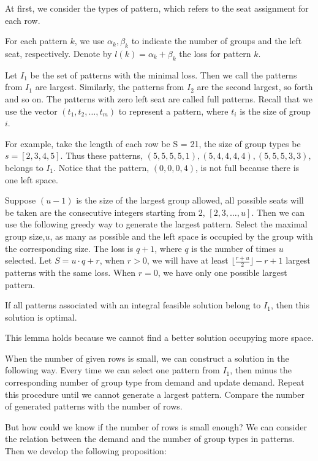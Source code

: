 At first, we consider the types of pattern, which refers to the seat assignment for each row.

For each pattern $k$, we use $\alpha_k, \beta_k$ to indicate the number of groups and the left seat, respectively. Denote by $l(k) = \alpha_k + \beta_k$ the loss for pattern $k$.

Let $I_1$ be the set of patterns with the minimal loss. Then we call the patterns from $I_1$ are largest. Similarly, the patterns from $I_2$ are the second largest, so forth and so on. The patterns with zero left seat are called full patterns. Recall that we use the vector $(t_1, t_2, \ldots, t_m)$ to represent a pattern, where $t_i$ is the size of group $i$. 

For example, take the length of each row be S = 21, the size of group types be $s = [2, 3, 4, 5]$. Thus these patterns, $(5, 5, 5, 5, 1),(5, 4, 4, 4, 4),(5, 5, 5, 3, 3)$, belongs to $I_1$. Notice that
the pattern, $(0, 0, 0, 4)$, is not full because there is one left space.

Suppose $(u-1)$ is the size of the largest group allowed, all possible seats will be taken are the consecutive integers starting from 2, $[2,3,\ldots,u]$.
Then we can use the following greedy way to generate the largest pattern. Select the maximal group size,$u$, as many as possible and the left space is occupied by the group with the corresponding size. The loss is $q+1$, where $q$ is the number of times $u$ selected. Let $S = u\cdot q + r$, when $r>0$, we will have at least $\lfloor \frac{r+u}{2} \rfloor -r +1$ largest patterns with the same loss. When $r =0$, we have only one possible largest pattern.

\begin{lem}
If all patterns associated with an integral feasible solution belong to $I_1$, then this solution is optimal.
\end{lem}

This lemma holds because we cannot find a better solution occupying more space.

When the number of given rows is small, we can construct a solution in the following way. Every time we can select one pattern from $I_1$, then minus the corresponding number of group type from demand and update demand. Repeat this procedure until we cannot generate a largest pattern. Compare the number of generated patterns with the number of rows.

But how could we know if the number of rows is small enough?
We can consider the relation between the demand and the number of group types in patterns. Then we develop the following proposition:

